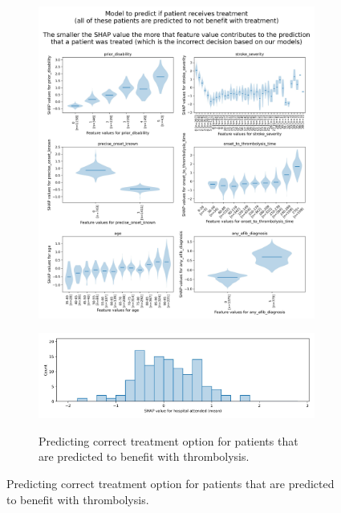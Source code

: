 \begin{figure}
\begin{subfigure}{.5\textwidth}
      \includegraphics[trim={0 0 0 5cm}, clip, width=0.95\linewidth]{./images/210_xgb_all_data_multiclass_outcome_999999_shap_violin_all_features_none_benefit_with_ivt}\\%
        \label{fig:mrs6_violin_split}
    \end{subfigure}
    \hfill
    \begin{subfigure}{.5\textwidth}
      \centering
      \captionsetup{width=.9\linewidth}
      \includegraphics[trim={0 0 0 0.1cm}, clip, width=1\linewidth]    {./images/210_xgb_all_data_multiclass_outcome_999999_hosp_shap_hist_should}\\
      \caption{Predicting correct treatment option for patients that are predicted to benefit with thrombolysis.}

\end{subfigure}
\end{figure}
